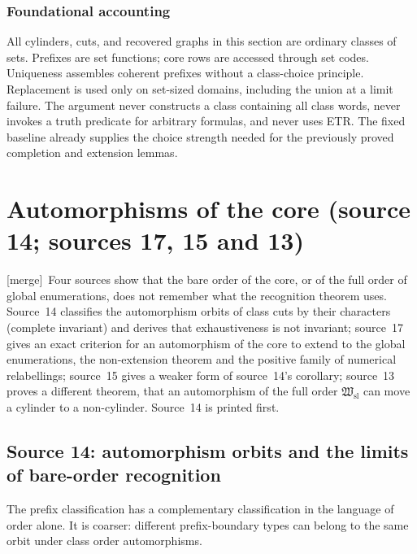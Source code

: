 \documentclass[11pt]{article}
\theoremstyle{definition}
\theoremstyle{remark}
\newcommand{\Hsl}{\mathfrak W_{\mathrm{sl}}}
\newcommand{\merge}{\textsf{[merge]}}
\begin{document}
\subsubsection{Foundational accounting}

All cylinders, cuts, and recovered graphs in this section are
ordinary classes of sets.  Prefixes are set functions; core rows
are accessed through set codes.  Uniqueness assembles coherent
prefixes without a class-choice principle.  Replacement is used
only on set-sized domains, including the union at a limit failure.
The argument never constructs a class containing all class words,
never invokes a truth predicate for arbitrary formulas, and never
uses ETR.  The fixed baseline already supplies the choice strength
needed for the previously proved completion and extension lemmas.

\section{Automorphisms of the core (source 14; sources 17, 15 and 13)}\label{swo:viii:sec:automorphisms}

\merge\ Four sources show that the bare order of the core, or of the full
order of global enumerations, does not remember what the recognition theorem
uses. Source~14 classifies the automorphism orbits of class cuts by their
characters (complete invariant) and derives that exhaustiveness is not
invariant; source~17 gives an exact criterion for an automorphism of the
core to extend to the global enumerations, the non-extension theorem and the
positive family of numerical relabellings; source~15 gives a weaker form of
source~14's corollary; source~13 proves a different theorem, that an
automorphism of the full order $\Hsl$ can move a cylinder to a non-cylinder.
Source~14 is printed first.

\subsection{Source 14: automorphism orbits and the limits of bare-order recognition}
\label{swo:tc:sec:orbits}
The prefix classification has a complementary classification in the
language of order alone. It is coarser: different prefix-boundary types
can belong to the same orbit under class order automorphisms.
\end{document}
